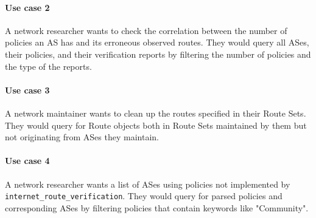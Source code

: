 \documentclass[12pt]{article}
\begin{document}
\paragraph{Use case 2}
A network researcher wants to check the correlation between
the number of policies an AS has and
its erroneous observed routes.
They would query all ASes, their policies,
and their verification reports by
filtering the number of policies and the type of the reports.

\paragraph{Use case 3}
A network maintainer wants to clean up the routes specified in
their Route Sets.
They would query for Route objects both in Route Sets maintained by
them but not originating from ASes they maintain.

\paragraph{Use case 4}
A network researcher wants a list of ASes using policies not implemented by
\verb|internet_route_verification|.
They would query for parsed policies and corresponding ASes by
filtering policies that contain keywords like "Community".

\printbibliography
\end{document}
